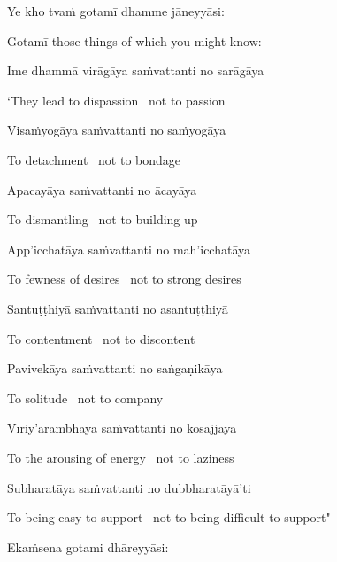 Ye kho tvaṁ gotamī dhamme jāneyyāsi:

\begin{english}
  Gotamī those things of which you might know:
\end{english}

Ime dhammā virāgāya saṁvattanti no sarāgāya

\begin{english}
  `They lead to dispassion \breathmark\ not to passion
\end{english}

Visaṁyogāya saṁvattanti no saṁyogāya

\begin{english}
  To detachment \breathmark\ not to bondage
\end{english}

Apacayāya saṁvattanti no ācayāya

\begin{english}
  To dismantling \breathmark\ not to building up
\end{english}

App'icchatāya saṁvattanti no mah'icchatāya

\begin{english}
  To fewness of desires \breathmark\ not to strong desires
\end{english}

Santuṭṭhiyā saṁvattanti no asantuṭṭhiyā

\begin{english}
  To contentment \breathmark\ not to discontent
\end{english}

Pavivekāya saṁvattanti no saṅgaṇikāya

\begin{english}
  To solitude \breathmark\ not to company
\end{english}

Vīriy'ārambhāya saṁvattanti no kosajjāya

\begin{english}
  To the arousing of energy \breathmark\ not to laziness
\end{english}

Subharatāya saṁvattanti no dubbharatāyā'ti

\begin{english}
  To being easy to support \breathmark\ not to being difficult to support"
\end{english}

Ekaṁsena gotami dhāreyyāsi:

